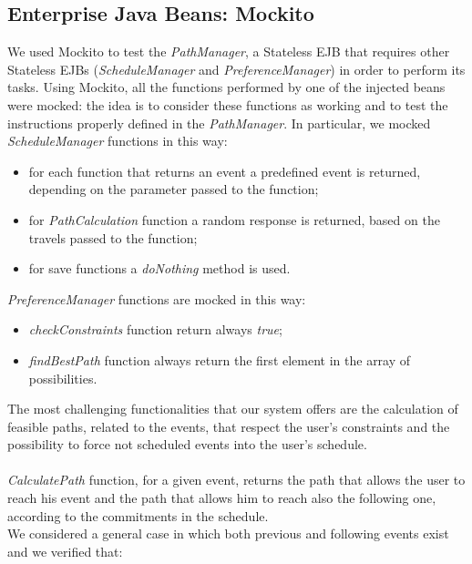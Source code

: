 \subsection{Enterprise Java Beans: Mockito}
We used Mockito to test the \textit{PathManager}, a Stateless EJB that requires other Stateless EJBs (\textit{ScheduleManager} and \textit{PreferenceManager}) in order to perform its tasks. Using Mockito, all the functions performed by one of the injected beans were mocked: the idea is to consider these functions as working and to test the instructions properly defined in the \textit{PathManager}. 
\newpage
\noindent
In particular, we mocked \textit{ScheduleManager} functions in this way:
\begin{itemize}
	\item for each function that returns an event a predefined event is returned, depending on the parameter passed to the function;
	\item for \textit{PathCalculation} function a random response is returned, based on the travels passed to the function;
	\item for save functions a \textit{doNothing} method is used.
\end{itemize}  
\textit{PreferenceManager} functions are mocked in this way:
\begin{itemize}
	\item \textit{checkConstraints} function return always \textit{true};
	\item \textit{findBestPath} function always return the first element in the array of possibilities.
\end{itemize}
The most challenging functionalities that our system offers are the calculation of feasible paths, related to the events, that respect the user's constraints and  the possibility to force not scheduled events into the user's schedule. \\ \\
\textit{CalculatePath} function, for a given event, returns the path that allows the user to reach his event and the path that allows him to reach also the following one, according to the commitments in the schedule. \\
We considered a general case in which both previous and following events exist and we verified that:

